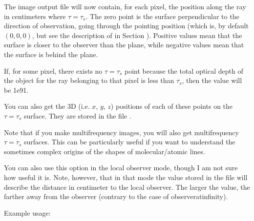 \documentclass[letterpaper,10pt,english]{sphinxmanual}
\begin{document}
The image output file  will now contain, for each pixel, the
position along the ray in centimeters where \(\tau=\tau_s\). The zero point
is the surface perpendicular to the direction of observation, going through the
pointing position (which is, by default \((0,0,0)\), but see the description
of  in Section {\hyperref[\detokenize{imagesspectra:sec-images}]{}}). Positive values mean that the
surface is closer to the observer than the plane, while negative values mean
that the surface is behind the plane.

If, for some pixel, there exists no \(\tau=\tau_s\) point because the total
optical depth of the object for the ray belonging to that pixel is less than
\(\tau_s\), then the value will be \sphinxhyphen{}1e91.

You can also get the 3\sphinxhyphen{}D (i.e. \(x\), \(y\), \(z\)) positions of
each of these points on the \(\tau=\tau_s\) surface. They are stored in the
file .

Note that if you make multi\sphinxhyphen{}frequency images, you will also get multi\sphinxhyphen{}frequency
\(\tau=\tau_s\) surfaces. This can be particularly useful if you want to
understand the sometimes complex origins of the shapes of molecular/atomic
lines.

You can also use this option in the local observer mode, though I am not sure
how useful it is. Note, however, that in that mode the value stored in the
 file will describe the distance in centimeter to the local
observer. The larger the value, the farther away from the observer (contrary to
the case of observer\sphinxhyphen{}at\sphinxhyphen{}infinity).

Example usage:

\begin{sphinxVerbatim}[commandchars=\\\{\}]
        
\end{sphinxVerbatim}
\end{document}
